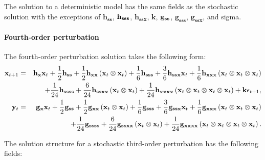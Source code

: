 \documentclass[notitlepage,11pt]{article}
\begin{document}
The solution to a deterministic model has the same fields as the stochastic
solution with the exceptions of $\mathbf{h}_{\mathbf{ss}}$, $\mathbf{h}_{%
\mathbf{sss}}$, $\mathbf{h}_{\mathbf{ssx}}$, $\mathbf{k}$, $\mathbf{g}_{%
\mathbf{ss}}$, $\mathbf{g}_{\mathbf{sss}}$, $\mathbf{g}_{\mathbf{ssx}}$, and
sigma.

\paragraph{Fourth-order perturbation}

The fourth-order perturbation solution takes the following form:%
\begin{eqnarray*}
\mathbf{x}_{t+1} &=&\mathbf{h}_{\mathbf{x}}\mathbf{x}_{t}+\frac{1}{2}\mathbf{%
h}_{\mathbf{ss}}+\frac{1}{2}\mathbf{h}_{\mathbf{xx}}\left( \mathbf{x}%
_{t}\otimes \mathbf{x}_{t}\right) +\frac{1}{6}\mathbf{h}_{\mathbf{sss}}+%
\frac{3}{6}\mathbf{h}_{\mathbf{ssx}}\mathbf{x}_{t}+\frac{1}{6}\mathbf{h}_{%
\mathbf{xxx}}\left( \mathbf{x}_{t}\otimes \mathbf{x}_{t}\otimes \mathbf{x}%
_{t}\right) \\
&&+\frac{1}{24}\mathbf{h}_{\mathbf{ssss}}+\frac{6}{24}\mathbf{h}_{\mathbf{%
ssxx}}\left( \mathbf{x}_{t}\otimes \mathbf{x}_{t}\right) +\frac{1}{24}%
\mathbf{h}_{\mathbf{xxxx}}\left( \mathbf{x}_{t}\otimes \mathbf{x}_{t}\otimes 
\mathbf{x}_{t}\otimes \mathbf{x}_{t}\right) +\mathbf{k\epsilon }_{t+1}, \\
\mathbf{y}_{t} &=&\mathbf{g}_{\mathbf{x}}\mathbf{x}_{t}+\frac{1}{2}\mathbf{g}%
_{\mathbf{ss}}+\frac{1}{2}\mathbf{g}_{\mathbf{xx}}\left( \mathbf{x}%
_{t}\otimes \mathbf{x}_{t}\right) +\frac{1}{6}\mathbf{g}_{\mathbf{sss}}+%
\frac{3}{6}\mathbf{g}_{\mathbf{ssx}}\mathbf{x}_{t}+\frac{1}{6}\mathbf{g}_{%
\mathbf{xxx}}\left( \mathbf{x}_{t}\otimes \mathbf{x}_{t}\otimes \mathbf{x}%
_{t}\right) \\
&&+\frac{1}{24}\mathbf{g}_{\mathbf{ssss}}+\frac{6}{24}\mathbf{g}_{\mathbf{%
ssxx}}\left( \mathbf{x}_{t}\otimes \mathbf{x}_{t}\right) +\frac{1}{24}%
\mathbf{g}_{\mathbf{xxxx}}\left( \mathbf{x}_{t}\otimes \mathbf{x}_{t}\otimes 
\mathbf{x}_{t}\otimes \mathbf{x}_{t}\right) .
\end{eqnarray*}

The solution structure for a stochastic third-order perturbation has the
following fields:
\end{document}
